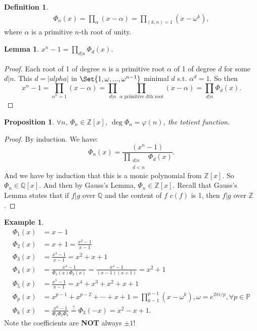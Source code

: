 \documentclass[9pt,reqno,twoside]{amsbook}
\theoremstyle{plain}
\numberwithin{section}{chapter}
\numberwithin{equation}{chapter}
\newtheorem{lem}[theorem]{Lemma}
\newtheorem{Prop}[theorem]{Proposition}
\theoremstyle{definition}
\newtheorem{Def}[theorem]{Definition}
\newtheorem{Ex}[theorem]{Example}
\theoremstyle{remark}
\theoremstyle{plain}
\newcommand{\z}{\mathbb{Z}}
\newcommand{\Q}{\mathbb{Q}}
\newcommand{\bee}{\begin{equation}\begin{aligned}}
\newcommand{\eee}{\end{aligned}\end{equation}}
\newcommand{\fracc}{\frac}
\renewcommand{\phi}{\varphi}
\begin{document}
\begin{Def}
\bee
\Phi_n(x) = \prod_{\alpha}(x - \alpha) = \prod_{(k,n) = 1}(x - \omega^k),
\eee
where $\alpha$ is a primitive $n$-th root of unity. 
\end{Def}

\begin{lem}
$x^n - 1 = \prod_{d|n}\Phi_d(x)$. 
\end{lem}

\begin{proof}
Each root of 1 of degree $n$ is a primitive root $\alpha$ of 1 of degree $d$ for some $d|n$. This $d = |alpha|$ in $\Set{1,\omega,...,\omega^{n - 1}}$ minimal $d$ s.t. $\alpha^d = 1$. So then 
$$
x^n - 1 = \prod_{\alpha^n  = 1}(x - \alpha) = \prod_{d|n}\prod_{\alpha \text{ primitive dth root}}(x - \alpha) = \prod_{d|n}\Phi_d(x).$$
\end{proof}

\begin{Prop}
$\forall n$, $\Phi_n \in \z[x]$, $\deg\Phi_n = \phi(n)$, the totient function. 
\end{Prop}

\begin{proof}
By induction. 
We have:
$$
\Phi_n(x) = \fracc{(x^n - 1)}{\prod_{\substack{d|n \\ d< n}}\Phi_d(x)}.
$$
And we have by induction that this is a monic polynomial from $\z[x]$. So $\Phi_n \in \Q[x]$. And then by Gauss's Lemma, $\Phi_n \in \z[x]$. Recall that Gauss's Lemma states that if $f|g$ over $\Q$ and the content of $f$ $c(f)$ is 1, then $f|g$ over $\z$. 
\end{proof}

\begin{Ex}
\bee
\Phi_1(x) &= x - 1\\
\Phi_2(x) &= x + 1 = \fracc{x^2 - 1}{x - 1}\\
\Phi_3(x) &= \fracc{x^3 - 1}{x - 1} = x^2 + x + 1\\
\Phi_4(x) &= \fracc{x^4 - 1}{\Phi_1(x)\Phi_2(x)} = \fracc{x^4 - 1}{(x - 1)(x + 1)} = x^2 + 1\\
\Phi_5(x) &= \fracc{x^5 - 1}{x - 1} = x^4 + x^3 + x^2 + x + 1\\
\Phi_p(x) &= x^{p - 1} + x^{p - 2} + \cdots + x + 1 = \prod_{k - 1}^{p - 1}(x - \omega^k), \omega = e^{2\pi i/p}, \forall p \in \mathbb{P}\\
\Phi_6(x) &= \fracc{x^6 - 1}{\Phi_1\Phi_2\Phi_3} \overset{?}{=} \Phi_3(-x) = x^2 -x + 1.
\eee
Note the coefficients are \textbf{NOT} always $\pm 1$!
\end{Ex}
\end{document}
